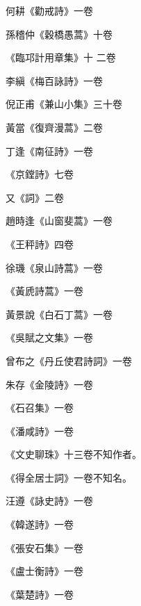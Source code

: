 \begin{pinyinscope}
 何耕《勸戒詩》一卷



 孫稽仲《穀橋愚蒿》十卷



 《臨邛計用章集》十
 二卷



 李縝《梅百詠詩》一卷



 倪正甫《兼山小集》三十卷



 黃當《復齊漫蒿》二卷



 丁逢《南征詩》一卷



 《京鏜詩》七卷



 又《詞》二卷



 趙時逢《山窗斐蒿》一卷



 《王秤詩》四卷



 徐璣《泉山詩蒿》一卷



 《黃虒詩蒿》一卷



 黃景說《白石丁蒿》一卷



 《吳賦之文集》一卷



 曾布之《丹丘使君詩詞》一卷



 朱存《金陵詩》一卷



 《石召集》一卷



 《潘咸詩》一卷



 《文史聊珠》十三卷不知作者。



 《得全居士詞》一卷不知名。



 汪遵《詠史詩》一卷



 《韓遂詩》一卷



 《張安石集》一卷



 《盧士衡詩》一卷



 《葉楚詩》一卷




\end{pinyinscope}
